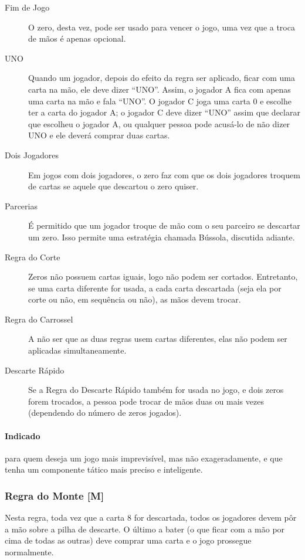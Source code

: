 \begin{description}
\item[Fim de Jogo]{O zero, desta vez, pode ser usado para vencer o jogo, uma vez que a troca de mãos é apenas opcional.}
\item[UNO]{Quando um jogador, depois do efeito da regra ser aplicado, ficar com uma carta na mão, ele deve dizer ``UNO''. Assim, o jogador A fica com apenas uma carta na mão e fala ``UNO''. O jogador C joga uma carta 0 e escolhe ter a carta do jogador A; o jogador C deve dizer ``UNO'' assim que declarar que escolheu o jogador A, ou qualquer pessoa pode acusá-lo de não dizer UNO e ele deverá comprar duas cartas.}
\item[Dois Jogadores]{Em jogos com dois jogadores, o zero faz com que os dois jogadores troquem de cartas se aquele que descartou o zero quiser.}
\item[Parcerias]{É permitido que um jogador troque de mão com o seu parceiro se descartar um zero. Isso permite uma estratégia chamada Bússola, discutida adiante.}
\item[Regra do Corte]{Zeros não possuem cartas iguais, logo não podem ser cortados. Entretanto, se uma carta diferente for usada, a cada carta descartada (seja ela por corte ou não, em sequência ou não), as mãos devem trocar.}
\item[Regra do Carrossel]{A não ser que as duas regras usem cartas diferentes, elas não podem ser aplicadas simultaneamente.}
\item[Descarte Rápido]{Se a Regra do Descarte Rápido também for usada no jogo, e dois zeros forem trocados, a pessoa pode trocar de mãos duas ou mais vezes (dependendo do número de zeros jogados).}
\end{description}

\paragraph{Indicado} 

para quem deseja um jogo mais imprevisível, mas não exageradamente, e que tenha um componente tático mais preciso e inteligente.

\subsubsection{Regra do Monte [M]}

Nesta regra, toda vez que a carta 8 for descartada, todos os jogadores devem pôr a mão sobre a pilha de descarte. O último a bater (o que ficar com a mão por cima de todas as outras) deve comprar uma carta e o jogo prossegue normalmente.


